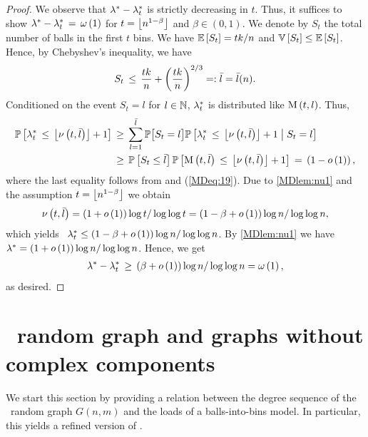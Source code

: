 \begin{proof}
We observe that $\lambda^\ast-\lambda^\ast_{ t}$ is strictly decreasing in $t$. Thus, it suffices to show $\lambda^\ast-\lambda^\ast_{ t}\hspace{0.06cm}=\hspace{0.06cm}\omega\left(1\right)$ for $t=\left\lfloor n^{1-\beta}\right\rfloor$ and $\beta\in (0,1)$. We denote by $S_t$ the total number of balls in the first $t$ bins. We have $\mathbb{E}\left[S_t\right]=tk/n$ and $\mathbb{V}\left[S_t\right]\leq \mathbb{E}\left[S_t\right]$. Hence, by Chebyshev's inequality, we have \whp\
\begin{align}\label{MDeq:19}
	S_t\hspace{0.06cm}\leq\hspace{0.06cm} \frac{tk}{n}+\left(\frac{tk}{n}\right)^{2/3}=:\bar{l}=\bar{l}(n).
\end{align}
Conditioned on the event $S_t=l$ for $l\in\mathbb{N}$, $\lambda^\ast_{t}$ is distributed like $\operatorname{M}\left(t, l\right)$. Thus,
\begin{align*}
	\mathbb{P}\left[\lambda^\ast_{t}\hspace{0.06cm}\leq\hspace{0.06cm} \left\lfloor\nu\left(t, \bar{l}\right)\right\rfloor+1\right]&\hspace{0.06cm}\geq\hspace{0.06cm} \sum_{l=1}^{\bar{l}}\mathbb{P}\big[S_t=l\big]\mathbb{P}\left[\lambda^\ast_{t}\hspace{0.06cm}\leq\hspace{0.06cm} \left\lfloor\nu\left(t, \bar{l}\right)\right\rfloor+1 \;\middle|\; S_t=l\right]
	\\
	&\hspace{0.06cm}\geq\hspace{0.06cm} \mathbb{P}\left[S_t\leq \bar{l}\right]\mathbb{P}\left[\operatorname{M}\left(t, \bar{l}\right)\hspace{0.06cm}\leq\hspace{0.06cm} \left\lfloor\nu\left(t, \bar{l}\right)\right\rfloor+1\right]
	\hspace{0.06cm}=\hspace{0.06cm}\left(1-o\left(1\right)\right),
\end{align*}
where the last equality follows from  and (\ref{MDeq:19}). Due to \ref{MDlem:nu1} and the assumption $t=\left\lfloor n^{1-\beta}\right\rfloor$ we obtain
\begin{align*}
\nu\left(t, \bar{l}\right)=\left(1+o\left(1\right)\right)\log t/\log \log t=\left(1-\beta+o\left(1\right)\right)\log n/\log \log n,
\end{align*}
which yields \whp\ $\lambda^\ast_{t}\leq\left(1-\beta+o\left(1\right)\right)\log n/\log\log n$. By \ref{MDlem:nu1} we have \whp\ $\lambda^\ast=\left(1+o\left(1\right)\right)\log n/\log\log n$. Hence, we get \whp\
\begin{align*}
\lambda^\ast-\lambda^\ast_{t}\hspace{0.06cm}\geq\hspace{0.06cm} \left(\beta+o\left(1\right)\right)\log n/\log\log n=\omega\left(1\right),    
\end{align*}
as desired.
\end{proof}

\section{\ER\ random graph and graphs without complex components}\label{MDsec:ergraph}
We start this section by providing a relation between the degree sequence of the \ER\ random graph $G(n,m)$ and the loads of a balls-into-bins model. In particular, this yields a refined version of .

